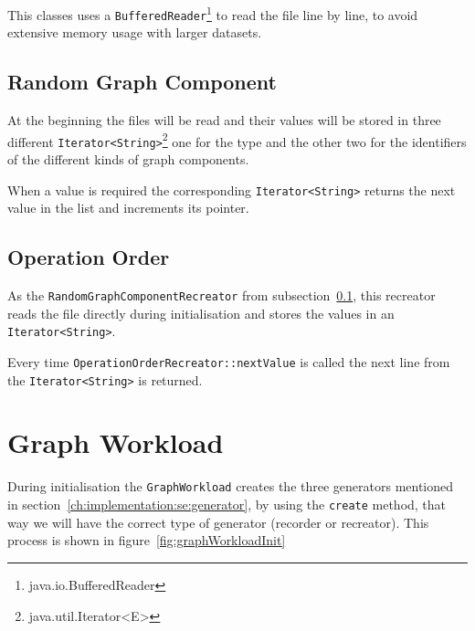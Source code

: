 This classes uses a \texttt{BufferedReader}\footnote{java.io.BufferedReader} to read the file line by line,
to avoid extensive memory usage with larger datasets.

\subsection{Random Graph Component}
\label{ch:implementation:se:randomGraphComponentRecreator}
At the beginning the files will be read and their values will be stored in three different \texttt{Iterator<String>}\footnote{java.util.Iterator<E>} one for the type and the other two for the identifiers of the different kinds of graph components.

When a value is required the corresponding \texttt{Iterator<String>} returns the next value in the list and increments its pointer.

\subsection{Operation Order}
As the \texttt{RandomGraphComponentRecreator} from subsection~\ref{ch:implementation:se:randomGraphComponentRecreator},
this recreator reads the file directly during initialisation and stores the values in an \texttt{Iterator<String>}.

Every time \texttt{OperationOrderRecreator::nextValue} is called the next line from the \texttt{Iterator<String>} is returned.

\section{Graph Workload}
\label{ch:implementation:se:graphWorkload}
During initialisation the \texttt{GraphWorkload} creates the three generators mentioned in section~\ref{ch:implementation:se:generator},
by using the \texttt{create} method,
that way we will have the correct type of generator (recorder or recreator).
This process is shown in figure~\ref{fig:graphWorkloadInit}

